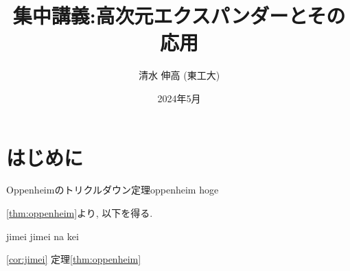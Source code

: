 \documentclass[11pt]{article}
\title{集中講義:高次元エクスパンダーとその応用}
\author{清水 伸高 (東工大)}
\date{2024年5月}
\begin{document}
\maketitle
\tableofcontents
\section{はじめに}
\begin{theorem}{Oppenheimのトリクルダウン定理}{oppenheim}
    hoge
\end{theorem}
\newpage
\cref{thm:oppenheim}より, 以下を得る.
\begin{corollary}{}{jimei}
    jimei na kei
\end{corollary}
\cref{cor:jimei}
定理\ref{thm:oppenheim}
\end{document}
